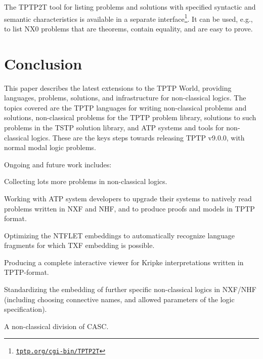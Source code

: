 \documentclass{ceurart}
\newenvironment{packed_itemize}{
\vspace*{-0.3em}
\begin{itemize}
\setlength{\partopsep}{0pt}
\setlength{\itemsep}{1pt}
\setlength{\parskip}{0pt}
\setlength{\parsep}{0pt}
}{\end{itemize}}
\begin{document}
The TPTP2T tool for listing problems and solutions with specified syntactic and semantic 
characteristics is available in a separate interface\footnote{%
\href{https://tptp.org/cgi-bin/TPTP2T}{\tt tptp.org/cgi-bin/TPTP2T}}. 
It can be used, e.g., to list NX0 problems that are theorems, contain equality, and are easy to 
prove.

\section{Conclusion}
\label{Conclusion}

This paper describes the latest extensions to the TPTP World, providing languages, problems,
solutions, and infrastructure for non-classical logics.
The topics covered are the TPTP languages for writing non-classical problems and solutions,
non-classical problems for the TPTP problem library,
solutions to such problems in the TSTP solution library,
and ATP systems and tools for non-classical logics.
These are the keys steps towards releasing TPTP v9.0.0, with normal modal logic problems.

Ongoing and future work includes:
\begin{packed_itemize}
\item Collecting lots more problems in non-classical logics.
\item Working with ATP system developers to upgrade their systems to natively read problems 
      written in NXF and NHF, and to produce proofs and models in TPTP format.
\item Optimizing the NTFLET embeddings to automatically recognize language fragments for which
      TXF embedding is possible.
\item Producing a complete interactive viewer for Kripke interpretations written in TPTP-format.
\item Standardizing the embedding of further specific non-classical logics in NXF/NHF (including
      choosing connective names, and allowed parameters of the logic specification).
\item A non-classical division of CASC.
\end{packed_itemize}


\end{document}
